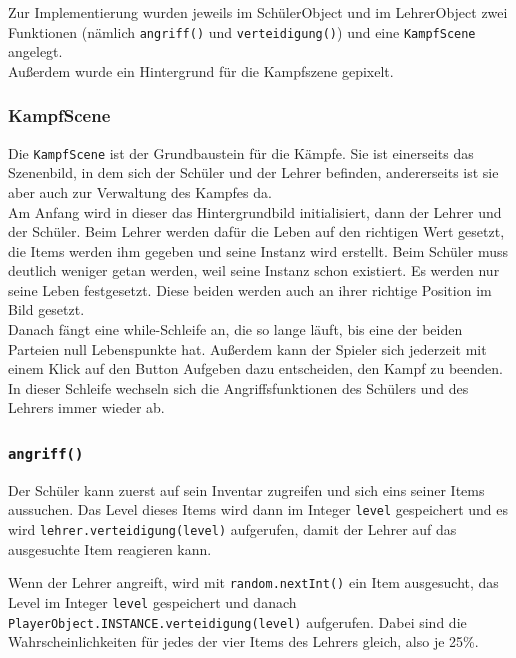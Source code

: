 Zur Implementierung wurden jeweils im SchülerObject und im LehrerObject zwei Funktionen (nämlich \texttt{angriff()} und \texttt{verteidigung()}) und eine \texttt{KampfScene} angelegt.\\
Außerdem wurde ein Hintergrund für die Kampfszene gepixelt.\\

\subsubsection{KampfScene}

Die \texttt{KampfScene} ist der Grundbaustein für die Kämpfe. Sie ist einerseits das Szenenbild, in dem sich der Schüler und der Lehrer befinden, andererseits ist sie aber auch zur Verwaltung des Kampfes da.\\
Am Anfang wird in dieser das Hintergrundbild initialisiert, dann der Lehrer und der Schüler. Beim Lehrer werden dafür die Leben auf den richtigen Wert gesetzt, die Items werden ihm gegeben und seine Instanz wird erstellt. Beim Schüler muss deutlich weniger getan werden, weil seine Instanz schon existiert. Es werden nur seine Leben festgesetzt. Diese beiden werden auch an ihrer richtige Position im Bild gesetzt.\\
Danach fängt eine while-Schleife an, die so lange läuft, bis eine der beiden Parteien null Lebenspunkte hat. Außerdem kann der Spieler sich jederzeit mit einem Klick auf den Button \glqq Aufgeben \grqq dazu entscheiden, den Kampf zu beenden.\\
In dieser Schleife wechseln sich die Angriffsfunktionen des Schülers und des Lehrers immer wieder ab.

\subsubsection{\texttt{angriff()}}

\begin{sloppypar}
Der Schüler kann zuerst auf sein Inventar zugreifen und sich eins seiner Items aussuchen. Das Level dieses Items wird dann im Integer \texttt{level} gespeichert und es wird \texttt{lehrer.verteidigung(level)} aufgerufen, damit der Lehrer auf das ausgesuchte Item reagieren kann.\par
Wenn der Lehrer angreift, wird mit \texttt{random.nextInt()} ein Item ausgesucht, das Level im Integer \texttt{level} gespeichert und danach \texttt{PlayerObject.INSTANCE.verteidigung(level)} aufgerufen. Dabei sind die Wahrscheinlichkeiten für jedes der vier Items des Lehrers gleich, also je 25\%.
\end{sloppypar}

